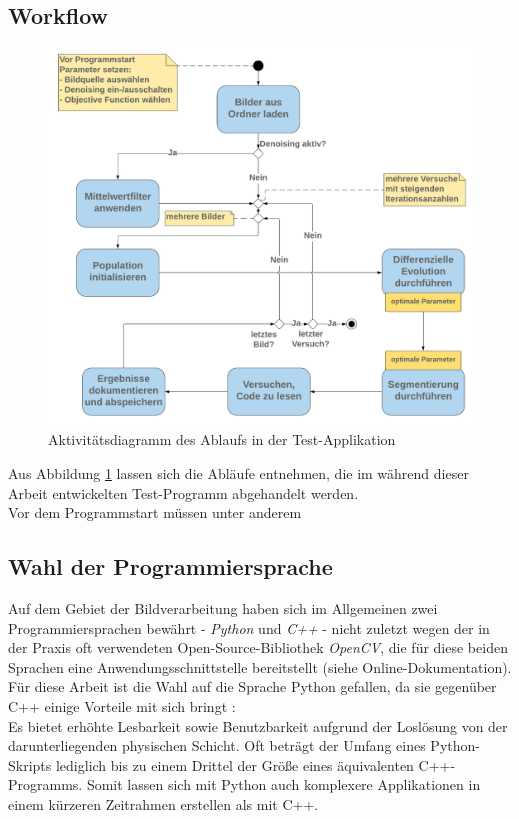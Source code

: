 		\subsection{Workflow}
		\label{sub:workflow}
			\begin{figure}[H]
				\centering
				\includegraphics[width=0.9\linewidth]{diff-evol-activity}
				\caption{Aktivitätsdiagramm des Ablaufs in der Test-Applikation}
				\label{fig:diff-evol-activity}
			\end{figure}
			Aus Abbildung \ref{fig:diff-evol-activity} lassen sich die Abläufe entnehmen, die im während dieser Arbeit entwickelten Test-Programm abgehandelt werden.\\
			Vor dem Programmstart müssen unter anderem 
	
		\subsection{Wahl der Programmiersprache}
		\label{sub:prog-lang}
			Auf dem Gebiet der Bildverarbeitung haben sich im Allgemeinen zwei Programmiersprachen bewährt - \textit{Python} und \textit{C++} - nicht zuletzt wegen der in der Praxis oft verwendeten Open-Source-Bibliothek \textit{OpenCV}, die für diese beiden Sprachen eine Anwendungsschnittstelle bereitstellt (siehe Online-Dokumentation). Für diese Arbeit ist die Wahl auf die Sprache Python gefallen, da sie gegenüber C++ einige Vorteile mit sich bringt \cite[S. 21f]{python-book}:\\
			Es bietet erhöhte Lesbarkeit sowie Benutzbarkeit aufgrund der Loslösung von der darunterliegenden physischen Schicht. Oft beträgt der Umfang eines Python-Skripts lediglich bis zu einem Drittel der Größe eines äquivalenten C++-Programms. Somit lassen sich mit Python auch komplexere Applikationen in einem kürzeren Zeitrahmen erstellen als mit C++.

